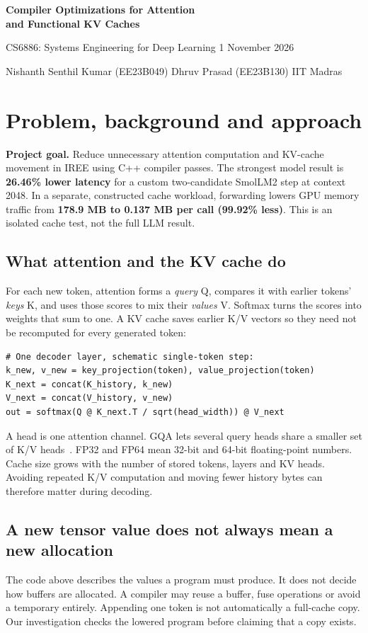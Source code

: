 \documentclass[10pt,a4paper]{article}
\newcommand{\projectauthors}{Nishanth Senthil Kumar (EE23B049) \quad Dhruv Prasad (EE23B130) \quad IIT Madras}
\begin{document}
\thispagestyle{plain}
{\LARGE\bfseries Compiler Optimizations for Attention\\[2pt]and Functional KV Caches\par}
{\small CS6886: Systems Engineering for Deep Learning \hfill 1 November 2026\par}
{\small\projectauthors\par}


\section{Problem, background and approach}
\begin{resultbox}
\textbf{Project goal.} Reduce unnecessary attention computation and KV-cache movement in IREE using C++ compiler passes. The strongest model result is \textbf{26.46\% lower latency} for a custom two-candidate SmolLM2 step at context 2048. In a separate, constructed cache workload, forwarding lowers GPU memory traffic from \textbf{178.9 MB to 0.137 MB per call (99.92\% less)}. This is an isolated cache test, not the full LLM result.
\end{resultbox}

\subsection*{What attention and the KV cache do}
For each new token, attention forms a \emph{query} Q, compares it with earlier tokens' \emph{keys} K, and uses those scores to mix their \emph{values} V. Softmax turns the scores into weights that sum to one. A KV cache saves earlier K/V vectors so they need not be recomputed for every generated token:
\begin{lstlisting}
# One decoder layer, schematic single-token step:
k_new, v_new = key_projection(token), value_projection(token)
K_next = concat(K_history, k_new)
V_next = concat(V_history, v_new)
out = softmax(Q @ K_next.T / sqrt(head_width)) @ V_next
\end{lstlisting}
A head is one attention channel. GQA lets several query heads share a smaller set of K/V heads~\cite{gqa,mqa}. FP32 and FP64 mean 32-bit and 64-bit floating-point numbers. Cache size grows with the number of stored tokens, layers and KV heads. Avoiding repeated K/V computation and moving fewer history bytes can therefore matter during decoding.

\subsection*{A new tensor value does not always mean a new allocation}
The code above describes the values a program must produce. It does not decide how buffers are allocated. A compiler may reuse a buffer, fuse operations or avoid a temporary entirely. Appending one token is not automatically a full-cache copy. Our investigation checks the lowered program before claiming that a copy exists.
\end{document}
